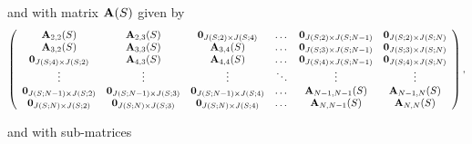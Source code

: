 \documentclass[preprint,12pt]{elsarticle}
\begin{document}
\par\noindent and with matrix ${\bf A}(S)$ given by
\begin{equation*}
  \left(\begin{array}{cccccc}
{\bf A}_{2,2}(S) & {\bf A}_{2,3}(S) & {\bf 0}_{J(S;2)\times J(S;4)} & \dots & {\bf 0}_{J(S;2)\times J(S;N-1)} & {\bf 0}_{J(S;2)\times J(S;N)}\\
{\bf A}_{3,2}(S) & {\bf A}_{3,3}(S) & {\bf A}_{3,4}(S) & \dots & {\bf 0}_{J(S;3)\times J(S;N-1)} & {\bf 0}_{J(S;3)\times J(S;N)}\\
{\bf 0}_{J(S;4)\times J(S;2)} & {\bf A}_{4,3}(S) & {\bf A}_{4,4}(S) & \dots & {\bf 0}_{J(S;4)\times J(S;N-1)} & {\bf 0}_{J(S;4)\times J(S;N)}\\
\vdots & \vdots & \vdots & \ddots & \vdots & \vdots\\
{\bf 0}_{J(S;N-1)\times J(S;2)} & {\bf 0}_{J(S;N-1)\times J(S;3)} & {\bf 0}_{J(S;N-1)\times J(S;4)} & \dots & {\bf A}_{N-1,N-1}(S) & {\bf A}_{N-1,N}(S) \\
{\bf 0}_{J(S;N)\times J(S;2)} & {\bf 0}_{J(S;N)\times J(S;3)} & {\bf 0}_{J(S;N)\times J(S;4)} & \dots & {\bf A}_{N,N-1}(S) & {\bf A}_{N,N}(S)
                        \end{array}\right),
\end{equation*}
\par\noindent and with sub-matrices
\end{document}

